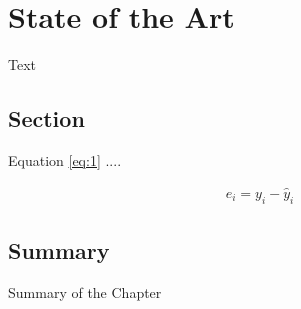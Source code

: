 \chapter{State of the Art}
\label{chap:chap2}

Text

\section{Section} 
\label{sec:something}

Equation \ref{eq:1} .... 

\begin{eqnarray}
\label{eq:1}
e_{i} = y_{i} - \hat{y}_{i}
\end{eqnarray}

\section{Summary}

Summary of the Chapter